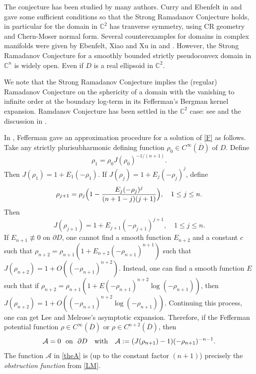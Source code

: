 \documentclass[12pt]{amsart}
\def\d{\partial}
\def\CC{\mathbb{C}}
\def\d{\partial}
\def\cal{\mathcal}
\begin{document}
 The conjecture has been studied by many authors. Curry and Ebenfelt in \cite{CE19} and \cite{CE21} gave some sufficient conditions so that the Strong Ramadanov Conjecture holds, in particular
 for the domain in $\CC^2$ has tranverse symmetry, using CR geometry and Chern-Moser normal form. Several counterexamples for domains in complex manifolds were given by Ebenfelt, Xiao and Xu in \cite{EXX22} and \cite{EXX25}. However, the Strong Ramadanov Conjecture for a smoothly bounded strictly pseudoconvex domain in $\mathbb C^n$ is widely open. Even if $D$ is a  real ellipsoid in $\CC^2$. 

We note that the Strong Ramadanov Conjecture implies the (regular) Ramadanov Conjecture on the sphericity of a domain with the vanishing to infinite order at the boundary log-term in its Fefferman's Bergman kernel expansion. Ramdanov Conjecture has been settled in the $\CC^2$ case: see \cite{BdM,Gr87b} and the discussion in \cite{EXX25}.
 
 In \cite{Fe76}, Fefferman gave  an approximation procedure for a solution of \eqref{F} as follows.  Take any  strictly plurisubharmonic defining function $\rho_0\in C^\infty(\overline{D})$  of $D$. Define
 \begin{equation}
 \rho_1=\rho_0 J(\rho_0)^{-1/(n+1)}.
 \end{equation}
Then 
$
J(\rho_1)=1+E_1(-\rho_1).
$
If $J(\rho_j)=1+E_j(-\rho_j)^j$, define
\begin{equation}
\rho_{j+1}= \rho_{j}\Big(1- {E_{j} (-\rho_{j})^{j}\over (n+1-j)(j+1) }\Big),\quad 1\le j\le n.
\end{equation}
Then
\begin{equation}
J(\rho_{j+1})=1+E_{j+1} (- \rho_{j+1} )^{j+1} ,\quad 1\le j\le n.
\end{equation}
If $E_{n+1}\not\equiv 0$ on $\d D$, one cannot find a smooth function $E_{n+2}$ and a constant $c$ such that $\rho_{n+2}=\rho_{n+1}(1+E_{n+2}(-\rho_{n+1})^{n+1})$
such that $J(\rho_{n+2})=1+O((-\rho_{n+1})^{n+2})$. Instead, one can find a smooth function $E$ such that 
if $\rho_{n+2}=\rho_{n+1}(1+E(-\rho_{n+1})^{n+2} \log(-\rho_{n+1}))$, then $J(\rho_{n+2})=1+O((-\rho_{n+1})^{n+2} \log(-\rho_{n+1}))$. Continuing this process, one can get Lee and
Melrose's asymptotic expansion. Therefore, if the Fefferman potential function $\rho\in C^\infty(\overline{D})$ or $\rho\in C^{n+2}(\overline{D})$, then 
\begin{equation}\label{theA}
{\cal A}=0 \ \ \hbox{on }\ \d D \quad \hbox{with} \quad {\cal A}:=(J(\rho_{n+1})-1)(-\rho_{n+1})^{-n-1}.
\end{equation}
The function $\cal A$ in \eqref{theA} is (up to the constant factor $(n+1)$) precisely the {\em obstruction function} from \eqref{LM}.
\end{document}
